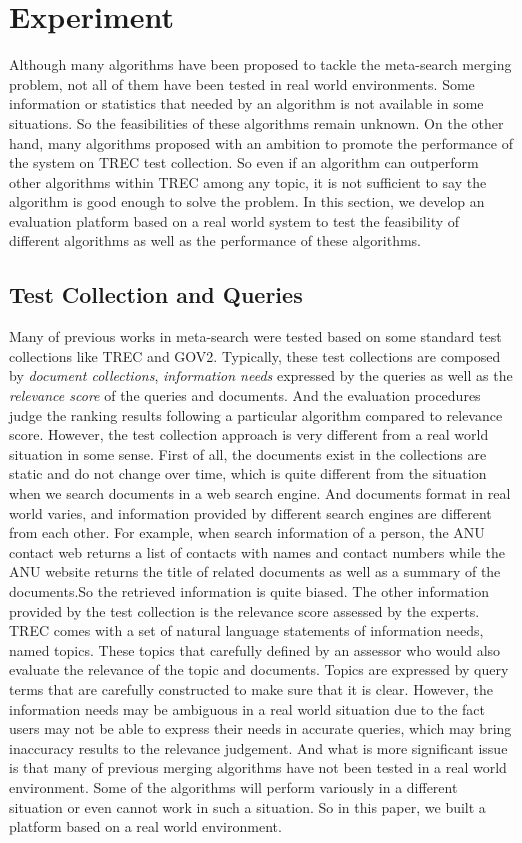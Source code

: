 \chapter{Experiment}
Although many algorithms have been proposed to tackle the meta-search merging problem, not all of them have been tested in real world environments. Some information or statistics that needed by an algorithm is not available in some situations. So the feasibilities of these algorithms remain unknown. On the other hand, many algorithms proposed with an ambition to promote the performance of the system on TREC test collection. So even if an algorithm can outperform other algorithms within TREC among any topic, it is not sufficient to say the algorithm is good enough to solve the problem. In this section, we develop an evaluation platform based on a real world system to test the feasibility of different algorithms as well as the performance of these algorithms.

\section{Test Collection and Queries}
Many of previous works in meta-search were tested based on some standard test collections like TREC and GOV2. Typically, these test collections are composed by \textit{document collections}, \textit{information needs} expressed by the queries as well as the \textit{relevance score} of the queries and documents. And the evaluation procedures judge the ranking results following a particular algorithm compared to relevance score. However, the test collection approach is very different from a real world situation in some sense. First of all, the documents exist in the collections are static and do not change over time, which is quite different from the situation when we search documents in a web search engine. And documents format in real world varies, and information provided by different search engines are different from each other. For example, when search information of a person, the ANU contact web returns a list of contacts with names and contact numbers while the ANU website returns the title of related documents as well as a summary of the documents.So the retrieved information is quite biased. The other information provided by the test collection is the relevance score assessed by the experts. TREC comes with a set of natural language statements of information needs, named topics\cite{Voorhees1999}. These topics that carefully defined by an assessor who would also evaluate the relevance of the topic and documents. Topics are expressed by query terms that are carefully constructed to make sure that it is clear. However, the information needs may be ambiguous in a real world situation due to the fact users may not be able to express their needs in accurate queries, which may bring inaccuracy results to the relevance judgement\cite{Thomas2006}. And what is more significant issue is that many of previous merging algorithms have not been tested in a real world environment. Some of the algorithms will perform variously in a different situation or even cannot work in such a situation. So in this paper, we built a platform based on a real world environment.

